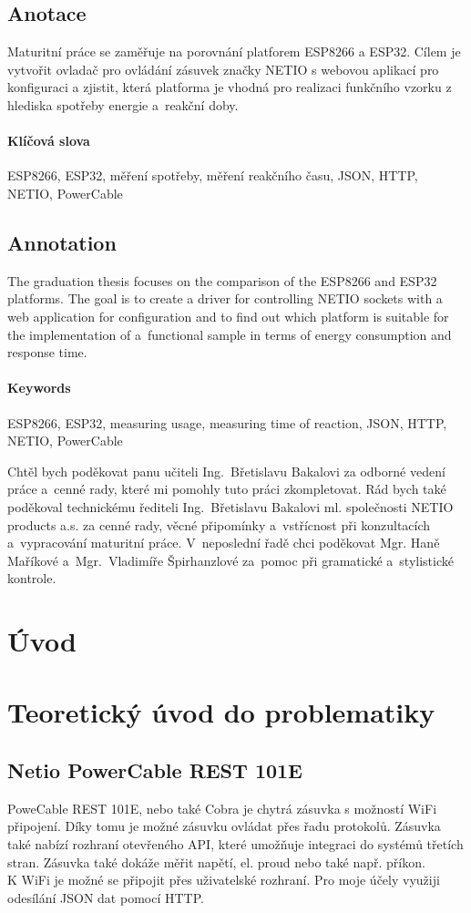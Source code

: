 \documentclass[a4paper, 12pt]{report}
\begin{document}
	\titulniStrana
	\section*{Anotace}
		Maturitní práce se zaměřuje na porovnání platforem ESP8266 a ESP32. Cílem je vytvořit ovladač pro ovládání zásuvek značky NETIO s webovou aplikací pro konfiguraci a zjistit, která platforma je vhodná pro realizaci funkčního vzorku z hlediska spotřeby energie a~reakční doby.
		\subsubsection*{Klíčová slova}
		ESP8266, ESP32, měření spotřeby, měření reakčního času, JSON, HTTP, NETIO, PowerCable

	\section*{Annotation}
		The graduation thesis focuses on the comparison of the ESP8266 and ESP32 platforms. The goal is to create a driver for controlling NETIO sockets with a web application for configuration and to find out which platform is suitable for the implementation of a~functional sample in terms of energy consumption and response time.
		\subsubsection*{Keywords}
		ESP8266, ESP32, measuring usage, measuring time of reaction, JSON, HTTP, NETIO, PowerCable

	\podekovani
		Chtěl bych poděkovat panu učiteli Ing.~Břetislavu Bakalovi za odborné vedení práce a~cenné rady, které mi pomohly tuto práci zkompletovat. Rád bych také poděkoval  technickému řediteli Ing.~Břetislavu Bakalovi ml. společnosti NETIO products a.s. za cenné rady, věcné připomínky a~vstřícnost při konzultacích a~vypracování maturitní práce. V~neposlední řadě chci poděkovat Mgr. Haně Maříkové a~Mgr.~Vladimíře Špirhanzlové za~pomoc při gramatické a~stylistické kontrole.
	\tableofcontents

	\chapter{Úvod}
	\chapter{Teoretický úvod do problematiky}

		\section{Netio PowerCable REST 101E}
		PoweCable REST 101E, nebo také Cobra je chytrá zásuvka s možností WiFi připojení. Díky tomu je možné zásuvku ovládat přes řadu protokolů. Zásuvka také nabízí rozhraní otevřeného API, které umožňuje integraci do systémů třetích stran. Zásuvka také dokáže měřit napětí, el. proud nebo také např. příkon. \\
		K WiFi je možné se připojit přes uživatelské rozhraní. Pro moje účely využiji odesílání JSON dat pomocí HTTP.
\end{document}
